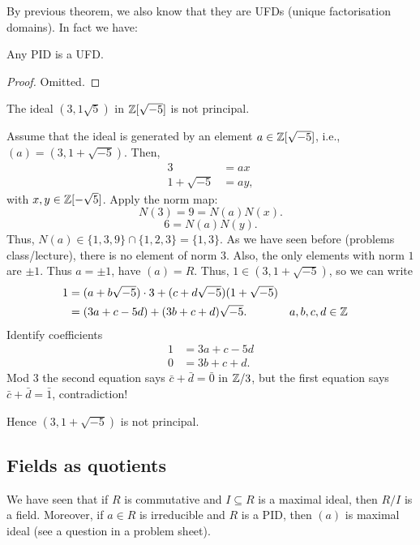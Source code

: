 \documentclass[10pt, a4paper]{article}
\begin{document}
By previous theorem,
we also know that they are UFDs
(unique factorisation domains).
In fact we have:

\begin{theorem}
    Any PID is a UFD.

    \begin{proof}
        Omitted.
    \end{proof}
\end{theorem}

\begin{example}
    The ideal $(3, 1 \sqrt{5})$ in $\mathbb{Z}[\sqrt{-5}]$ is not principal.

    Assume that the ideal is generated by an element $a \in \mathbb{Z}[\sqrt{-5}]$,
    i.e.,
    $(a) = (3, 1 + \sqrt{-5})$.
    Then,
    \begin{align*}
        3 &= ax \\
        1 + \sqrt{-5} &= ay,
    \end{align*}
    with $x, y \in \mathbb{Z}[-\sqrt{5}]$.
    Apply the norm map:
    \[
    N(3) = 9 = N(a)N(x).
    \]
    \[
    6 = N(a)N(y).
    \]
    Thus,
    $N(a) \in \{1, 3, 9\} \cap \{1, 2, 3\} = \{1, 3\}$.
    As we have seen before
    (problems class/lecture),
    there is no element of norm $3$.
    Also,
    the only elements with norm $1$ are $\pm 1$.
    Thus $a = \pm 1$,
    have $(a) = R$.
    Thus,
    $1 \in (3, 1 + \sqrt{-5})$,
    so we can write
    \begin{align*}
        1 &= (a + b\sqrt{-5})\cdot 3 + (c + d\sqrt{-5})(1 + \sqrt{-5}) \\
        &= (3a + c - 5d) + (3b + c + d)\sqrt{-5}. && a, b, c, d \in \mathbb{Z}
    \end{align*}
    Identify coefficients
    \begin{align*}
        1 &= 3a + c - 5d \\
        0 &= 3b + c + d.
    \end{align*}
    Mod $3$ the second equation says $\bar{c} + \bar{d} = \bar{0}$ in $\mathbb{Z} / 3$,
    but the first equation says $\bar{c} + \bar{d} = \bar{1}$,
    contradiction!

    Hence $(3, 1 + \sqrt{-5})$ is not principal.
\end{example}

\subsection{Fields as quotients}
We have seen that if $R$ is commutative and $I \subseteq R$ is a maximal ideal,
then $R / I$ is a field.
Moreover,
if $a \in R$ is irreducible and $R$ is a PID,
then $(a)$ is maximal ideal
(see a question in a problem sheet).
\end{document}
